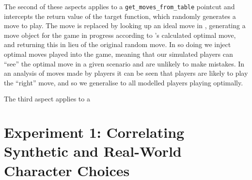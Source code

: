 The second of these aspects applies to a \lstinline{get_moves_from_table} pointcut and
intercepts the return value of the target function, which randomly generates a
move to play. The move is replaced by looking up an ideal move in
\cite{kavanagh2020}, generating a move object for the game in progress
according to 's calculated optimal move, and returning this
in lieu of the original random move. In so doing we inject optimal moves played
into the game, meaning that our simulated players can ``see'' the optimal move
in a given scenario and are unlikely to make mistakes. In an analysis of moves
made by players it can be seen that players are likely to play the ``right''
move, and so we generalise to all modelled players playing optimally.

The third aspect applies to a \lstinline{}



\label{sec:experiment1}
\label{exp:rpglite-simple}
\section{Experiment 1: Correlating Synthetic and Real-World Character Choices}

